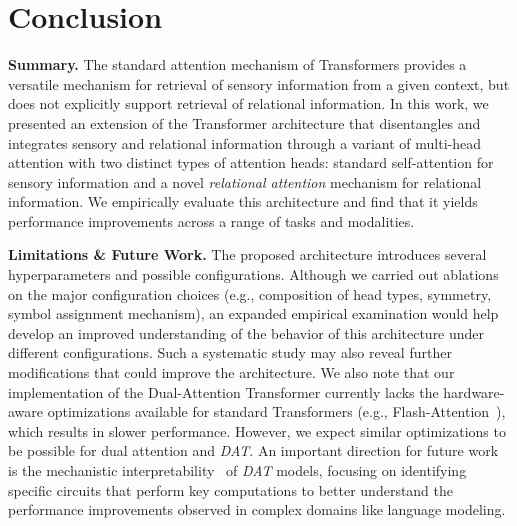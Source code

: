 \section{Conclusion}\label{sec:discussion}

\textbf{Summary.} The standard attention mechanism of Transformers provides a versatile mechanism for retrieval of sensory information from a given context, but does not explicitly support retrieval of relational information. In this work, we presented an extension of the Transformer architecture that disentangles and integrates sensory and relational information through a variant of multi-head attention with two distinct types of attention heads: standard self-attention for sensory information and a novel \textit{relational attention} mechanism for relational information. We empirically evaluate this architecture and find that it yields performance improvements across a range of tasks and modalities.

\textbf{Limitations \& Future Work.} The proposed architecture introduces several hyperparameters and possible configurations. Although we carried out ablations on the major configuration choices (e.g., composition of head types, symmetry, symbol assignment mechanism), an expanded empirical examination would help develop an improved understanding of the behavior of this architecture under different configurations. Such a systematic study may also reveal further modifications that could improve the architecture. We also note that our implementation of the Dual-Attention Transformer currently lacks the hardware-aware optimizations available for standard Transformers (e.g., Flash-Attention~\citep{dao2022flashattention}), which results in slower performance. However, we expect similar optimizations to be possible for dual attention and \textit{DAT}. An important direction for future work is the mechanistic interpretability~\citep{elhage2021mathematical,olsson2022context,wang2023interpretability} of \textit{DAT} models, focusing on identifying specific circuits that perform key computations to better understand the performance improvements observed in complex domains like language modeling.